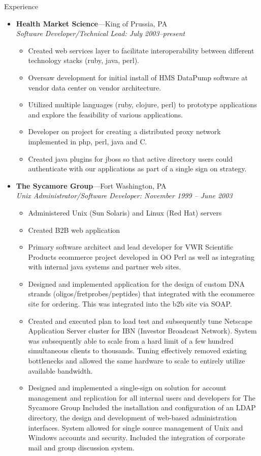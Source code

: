 \documentclass[11pt,oneside]{article}
\newenvironment{ressection}[1]{
	\vspace{4pt}
	{\fontfamily{phv}\selectfont\Large#1}
	\begin{itemize}
	\vspace{3pt}
}{
	\end{itemize}
}
\newcommand{\ressubitem}[1]{
	\vspace{-1pt}
	\item \begin{flushleft} #1 \end{flushleft}
}
\newcommand{\resbigitem}[3]{
	\vspace{-5pt}
	\item
	\textbf{#1}---#2 \\
	\textit{#3}
}
\newenvironment{ressubsec}[3]{
	\resbigitem{#1}{#2}{#3}
	\vspace{-2pt}
	\begin{itemize}
}{
	\end{itemize}
}
\begin{document}
\begin{ressection}{Experience}
\begin{ressubsec}{Health Market Science}{King of Prussia, PA}{Software Developer/Technical Lead: July 2003--present}
          \ressubitem{Created web services layer to facilitate
            interoperability between different technology stacks
            (ruby, java, perl).}

	  \ressubitem{Oversaw development for initial install of HMS
            DataPump software at vendor data center on vendor
            architecture.}

	  \ressubitem{Utilized multiple languages (ruby, clojure,
            perl) to prototype applications and explore the
            feasibility of various applications.}

	  \ressubitem{Developer on project for creating a distributed
            proxy network implemented in php, perl, java and C.}

          \ressubitem{Created java plugins for jboss so that active
            directory users could authenticate with our applications
            as part of a single sign on strategy.}

	\end{ressubsec}

	\begin{ressubsec}{The Sycamore Group}{Fort Washington, PA}{Unix Administrator/Software Developer: November 1999 -- June 2003}

	  \ressubitem{Administered Unix (Sun Solaris) and Linux (Red Hat) servers}

	  \ressubitem{Created B2B web application}

	  \ressubitem{Primary software architect and lead developer
            for VWR Scientific Products ecommerce project developed in
            OO Perl as well as integrating with internal java systems
            and partner web sites. }

	  \ressubitem{Designed and implemented application for the
            design of custom DNA strands (oligos/fretprobes/peptides)
            that integrated with the ecommerce site for ordering. This
            was integrated into the b2b site via SOAP.}

	  \ressubitem{Created and executed plan to load test and
            subsequently tune Netscape Application Server cluster for
            IBN (Investor Broadcast Network). System was subsequently
            able to scale from a hard limit of a few hundred
            simultaneous clients to thousands. Tuning effectively
            removed existing bottlenecks and allowed the same hardware
            to scale to entirely utilize available bandwidth. }

	  \ressubitem{Designed and implemented a single-sign on
            solution for account management and replication for all
            internal users and developers for The Sycamore Group
            Included the installation and configuration of an LDAP
            directory, the design and development of web-based
            administration interfaces. System allowed for single
            source management of Unix and Windows accounts and
            security. Included the integration of corporate mail and
            group discussion system. }


\end{ressubsec}
\end{ressection}
\end{document}
